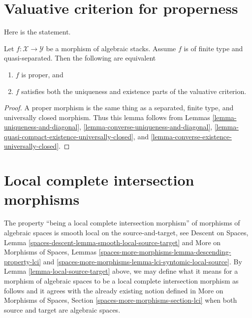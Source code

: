 \section{Valuative criterion for properness}
\label{section-valutive-criterion-properness}

\noindent
Here is the statement.

\begin{lemma}
\label{lemma-criterion-proper}
Let $f : \mathcal{X} \to \mathcal{Y}$ be a morphism of algebraic stacks.
Assume $f$ is of finite type and quasi-separated.
Then the following are equivalent
\begin{enumerate}
\item $f$ is proper, and
\item $f$ satisfies both the uniqueness and existence parts
of the valuative criterion.
\end{enumerate}
\end{lemma}

\begin{proof}
A proper morphism is the same thing as a separated, finite type, and
universally closed morphism. Thus this lemma follows from Lemmas
\ref{lemma-uniqueness-and-diagonal},
\ref{lemma-converse-uniqueness-and-diagonal},
\ref{lemma-quasi-compact-existence-universally-closed}, and
\ref{lemma-converse-existence-universally-closed}.
\end{proof}







\section{Local complete intersection morphisms}
\label{section-lci}

\noindent
The property ``being a local complete intersection morphism''
of morphisms of algebraic spaces is
smooth local on the source-and-target, see
Descent on Spaces, Lemma \ref{spaces-descent-lemma-smooth-local-source-target}
and
More on Morphisms of Spaces, Lemmas
\ref{spaces-more-morphisms-lemma-descending-property-lci} and
\ref{spaces-more-morphisms-lemma-lci-syntomic-local-source}.
By Lemma \ref{lemma-local-source-target} above, we may define what it
means for a morphism of algebraic spaces to be
a local complete intersection morphism as follows and it agrees with the
already existing notion defined in
More on Morphisms of Spaces,
Section \ref{spaces-more-morphisms-section-lci}
when both source and target are algebraic spaces.

